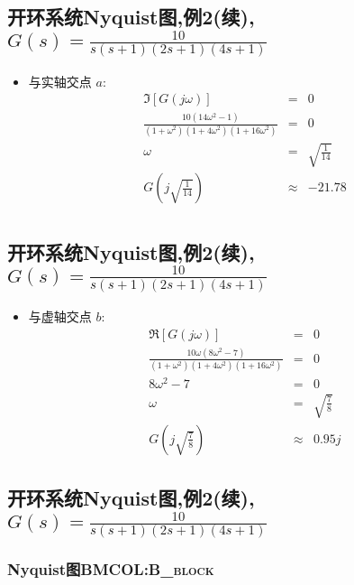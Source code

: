 \documentclass[table]{article}
\begin{document}
\subsection{开环系统Nyquist图,例2(续),\(G(s)=\frac{10}{s(s+1)(2s+1)(4s+1)}\)}
\label{sec:orgf2d3232}
\begin{itemize}
\item 与实轴交点  \(a\):
\begin{eqnarray*}
\Im[G(j\omega)] & = & 0\\
\frac{10(14\omega^2-1)}{(1+\omega^2)(1+4\omega^2)(1+16\omega^2)} &=&0\\
\omega &=& \sqrt{\frac{1}{14}}\\
G(j\sqrt{\frac{1}{14}}) &\approx& -21.78 \\
\end{eqnarray*}
\end{itemize}
\subsection{开环系统Nyquist图,例2(续),\(G(s)=\frac{10}{s(s+1)(2s+1)(4s+1)}\)}
\label{sec:org85a5a47}
\begin{itemize}
\item 与虚轴交点  \(b\):
\begin{eqnarray*}
\Re[G(j\omega)] & = & 0\\
\frac{10\omega(8\omega^2-7)}{(1+\omega^2)(1+4\omega^2)(1+16\omega^2)} &=&0\\
8\omega^2-7 &=& 0\\
\omega &=& \sqrt{\frac{7}{8}}\\
G(j\sqrt{\frac{7}{8}}) &\approx& 0.95j
\end{eqnarray*}
\end{itemize}
\subsection{开环系统Nyquist图,例2(续),\(G(s)=\frac{10}{s(s+1)(2s+1)(4s+1)}\)}
\label{sec:orge927ea9}
\subsubsection[Nyquist图]{Nyquist图\hfill{}\textsc{BMCOL:B\_block}}
\label{sec:orgfa09cbd}
\end{document}
